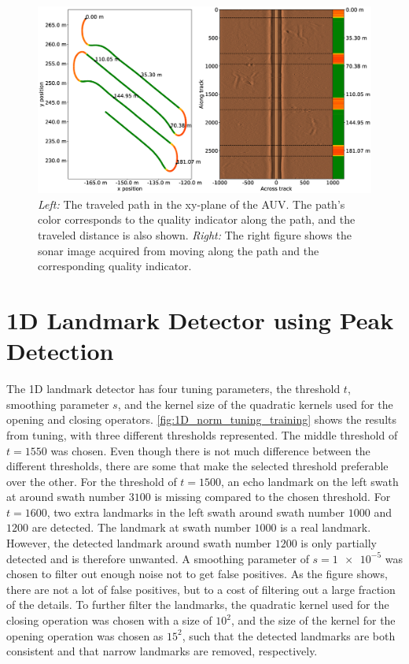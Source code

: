 \begin{figure} %
  \centering
  \includegraphics[width=1.0\textwidth]{figures/path_and_quality_indicator.eps}
  \caption[Path with quality indicator overlayed]{\textit{Left:} The traveled path in the xy-plane of the AUV. The path's color corresponds to the quality indicator along the path, and the traveled distance is also shown. \textit{Right:} The right figure shows the sonar image acquired from moving along the path and the corresponding quality indicator.}
  \label{fig:path_and_quality_ind}
\end{figure}

\section{1D Landmark Detector using Peak Detection}

The 1D landmark detector has four tuning parameters, the threshold $t$, smoothing parameter $s$, and the kernel size of the quadratic kernels used for the opening and closing operators. \cref{fig:1D_norm_tuning_training} shows the results from tuning, with three different thresholds represented. The middle threshold of $t = 1550$ was chosen. Even though there is not much difference between the different thresholds, there are some that make the selected threshold preferable over the other. For the threshold of $t = 1500$, an echo landmark on the left swath at around swath number $3100$ is missing compared to the chosen threshold. For $t = 1600$, two extra landmarks in the left swath around swath number $1000$ and $1200$ are detected. The landmark at swath number $1000$ is a real landmark. However, the detected landmark around swath number $1200$ is only partially detected and is therefore unwanted. A smoothing parameter of $s = \num{1e-5}$ was chosen to filter out enough noise not to get false positives. As the figure shows, there are not a lot of false positives, but to a cost of filtering out a large fraction of the details. To further filter the landmarks, the quadratic kernel used for the closing operation was chosen with a size of $10^2$, and the size of the kernel for the opening operation was chosen as $15^2$, such that the detected landmarks are both consistent and that narrow landmarks are removed, respectively.  

